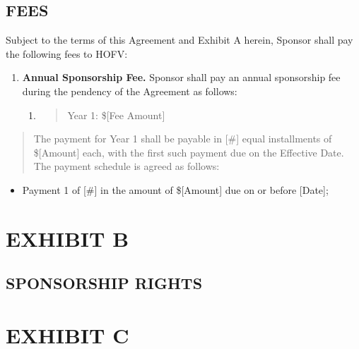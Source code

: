 \documentclass[]{article}
\begin{document}
\hypertarget{fees}{%
\subsection{FEES}\label{fees}}

Subject to the terms of this Agreement and Exhibit A herein, Sponsor
shall pay the following fees to HOFV:

\begin{enumerate}
\def\labelenumi{\arabic{enumi}.}
\item
  \textbf{Annual Sponsorship Fee.} Sponsor shall pay an annual
  sponsorship fee during the pendency of the Agreement as follows:

  \begin{enumerate}
  \def\labelenumii{\alph{enumii}.}
  \item
    \begin{quote}
    Year 1: \${[}Fee Amount{]}
    \end{quote}
  \end{enumerate}
\end{enumerate}

\begin{quote}
The payment for Year 1 shall be payable in {[}\#{]} equal installments
of \${[}Amount{]} each, with the first such payment due on the Effective
Date. The payment schedule is agreed as follows:
\end{quote}

\begin{itemize}
\item
  Payment 1 of {[}\#{]} in the amount of \${[}Amount{]} due on or before
  {[}Date{]};
\end{itemize}

\hypertarget{section}{%
\subsection{}\label{section}}

\hypertarget{exhibit-b}{%
\section{EXHIBIT B}\label{exhibit-b}}

\hypertarget{sponsorship-rights}{%
\subsection{SPONSORSHIP RIGHTS}\label{sponsorship-rights}}

\hypertarget{exhibit-c}{%
\section{EXHIBIT C}\label{exhibit-c}}
\end{document}
